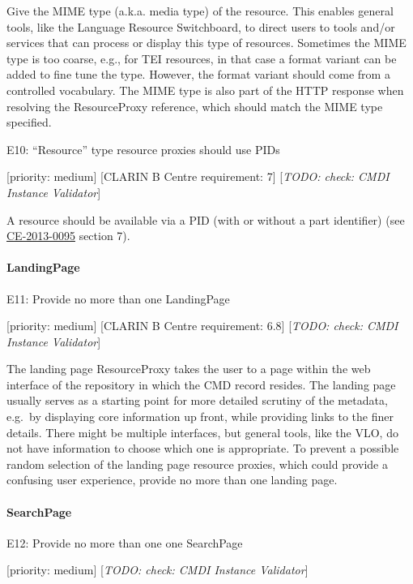 Give the MIME type (a.k.a. media type) of the resource. This enables
general tools, like the Language Resource Switchboard, to direct users
to tools and/or services that can process or display this type of
resources. Sometimes the MIME type is too coarse, e.g., for TEI
resources, in that case a format variant can be added to fine tune the
type. However, the format variant should come from a controlled
vocabulary. The MIME type is also part of the HTTP response when
resolving the ResourceProxy reference, which should match the MIME type
specified.

E10: ``Resource'' type resource proxies should use PIDs

{[}priority: medium{]} {[}CLARIN B Centre requirement: 7{]}
{[}\emph{TODO: check: CMDI Instance Validator}{]}

A resource should be available via a PID (with or without a part
identifier) (see
\href{http://hdl.handle.net/1839/00-DOCS.CLARIN.EU-78}{CE-2013-0095}
section 7).

\paragraph{LandingPage}\label{landingpage}

E11: Provide no more than one LandingPage

{[}priority: medium{]} {[}CLARIN B Centre requirement: 6.8{]}
{[}\emph{TODO: check: CMDI Instance Validator}{]}

The landing page ResourceProxy takes the user to a page within the web
interface of the repository in which the CMD record resides. The landing
page usually serves as a starting point for more detailed scrutiny of
the metadata, e.g.~by displaying core information up front, while
providing links to the finer details. There might be multiple
interfaces, but general tools, like the VLO, do not have information to
choose which one is appropriate. To prevent a possible random selection
of the landing page resource proxies, which could provide a confusing
user experience, provide no more than one landing page.

\paragraph{SearchPage}\label{searchpage}

E12: Provide no more than one one SearchPage

{[}priority: medium{]} {[}\emph{TODO: check: CMDI Instance Validator}{]}

